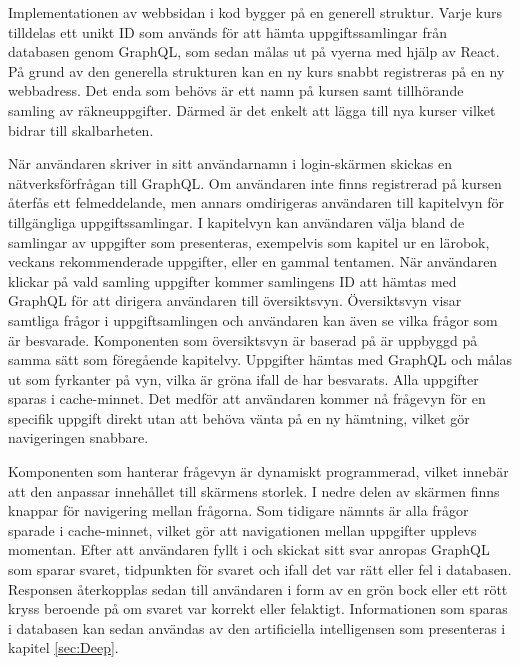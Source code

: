 
Implementationen av webbsidan i kod bygger på en generell struktur. Varje kurs tilldelas ett unikt ID som används för att hämta uppgiftssamlingar från databasen genom GraphQL, som sedan målas ut på vyerna med hjälp av React. På grund av den generella strukturen kan en ny kurs snabbt registreras på en ny webbadress. Det enda som behövs är ett namn på kursen samt tillhörande samling av räkneuppgifter. Därmed är det enkelt att lägga till nya kurser vilket bidrar till skalbarheten.

När användaren skriver in sitt användarnamn i login-skärmen skickas en nätverksförfrågan till GraphQL. Om användaren inte finns registrerad på kursen återfås ett felmeddelande, men annars omdirigeras användaren till kapitelvyn för tillgängliga uppgiftssamlingar. I kapitelvyn kan användaren välja bland de samlingar av uppgifter som presenteras, exempelvis som kapitel ur en lärobok, veckans rekommenderade uppgifter, eller en gammal tentamen. När användaren klickar på vald samling uppgifter kommer samlingens ID att hämtas med GraphQL för att dirigera användaren till översiktsvyn. Översiktsvyn visar samtliga frågor i uppgiftsamlingen och användaren kan även se vilka frågor som är besvarade. Komponenten som översiktsvyn är baserad på är uppbyggd på samma sätt som föregående kapitelvy. Uppgifter hämtas med GraphQL och målas ut som fyrkanter på vyn, vilka är gröna ifall de har besvarats. Alla uppgifter sparas i cache-minnet. Det medför att användaren kommer nå frågevyn för en specifik uppgift direkt utan att behöva vänta på en ny hämtning, vilket gör navigeringen snabbare.

Komponenten som hanterar frågevyn är dynamiskt programmerad, vilket innebär att den anpassar innehållet till skärmens storlek. I nedre delen av skärmen finns knappar för navigering mellan frågorna. Som tidigare nämnts är alla frågor sparade i cache-minnet, vilket gör att navigationen mellan uppgifter upplevs momentan. Efter att användaren fyllt i och skickat sitt svar anropas GraphQL som sparar svaret, tidpunkten för svaret och ifall det var rätt eller fel i databasen. Responsen återkopplas sedan till användaren i form av en grön bock eller ett rött kryss beroende på om svaret var korrekt eller felaktigt. Informationen som sparas i databasen kan sedan användas av den artificiella intelligensen som presenteras i kapitel \ref{sec:Deep}.


